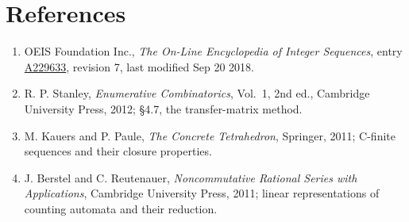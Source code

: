 \documentclass[11pt]{article}
\theoremstyle{definition}
\begin{document}
\section{References}

\begin{enumerate}

\item OEIS Foundation Inc., \emph{The On-Line Encyclopedia of Integer Sequences}, entry \href{https://oeis.org/A229633}{A229633}, revision 7, last modified Sep 20 2018.

\item R. P. Stanley, \emph{Enumerative Combinatorics}, Vol.~1, 2nd ed., Cambridge University Press, 2012; \S4.7, the transfer-matrix method.

\item M. Kauers and P. Paule, \emph{The Concrete Tetrahedron}, Springer, 2011; C-finite sequences and their closure properties.

\item J. Berstel and C. Reutenauer, \emph{Noncommutative Rational Series with Applications}, Cambridge University Press, 2011; linear representations of counting automata and their reduction.

\end{enumerate}
\end{document}
